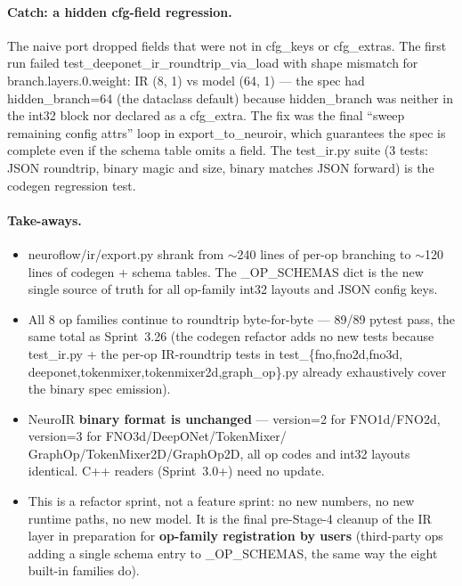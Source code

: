 \documentclass[10pt,twocolumn]{article}
\renewcommand{\texttt}[1]{{\normalfont\ttfamily #1}\normalfont\rmfamily}
\begin{document}
\paragraph{Catch: a hidden cfg-field regression.}
The naive port dropped fields that were not
in \texttt{cfg\_keys} or \texttt{cfg\_extras}.
The first run failed
\texttt{test\_deeponet\_ir\_roundtrip\_via\_load}
with \texttt{shape mismatch for
branch.layers.0.weight: IR (8, 1) vs model
(64, 1)} — the spec had
\texttt{hidden\_branch=64} (the dataclass
default) because \texttt{hidden\_branch} was
neither in the int32 block nor declared as a
\texttt{cfg\_extra}.  The fix was the final
``sweep remaining config attrs'' loop in
\texttt{export\_to\_neuroir}, which guarantees
the spec is complete even if the schema table
omits a field.  The \texttt{test\_ir.py}
suite (3 tests: JSON roundtrip, binary magic
and size, binary matches JSON forward) is the
codegen regression test.

\paragraph{Take-aways.}
\begin{itemize}
\item \texttt{neuroflow/ir/export.py} shrank
from $\sim$240 lines of per-op branching to
$\sim$120 lines of codegen + schema tables.
The \texttt{\_OP\_SCHEMAS} dict is the new
single source of truth for all op-family
int32 layouts and JSON config keys.
\item All 8 op families continue to roundtrip
byte-for-byte — 89/89 pytest pass, the same
total as Sprint~3.26 (the codegen refactor
adds no new tests because
\texttt{test\_ir.py} + the per-op IR-roundtrip
tests in \texttt{test\_\{fno,fno2d,fno3d,
deeponet,tokenmixer,tokenmixer2d,graph\_op\}.py}
already exhaustively cover the binary spec
emission).
\item NeuroIR \textbf{binary format is
unchanged} — version=2 for FNO1d/FNO2d,
version=3 for FNO3d/DeepONet/TokenMixer/
GraphOp/TokenMixer2D/GraphOp2D, all op codes
and int32 layouts identical.  C++ readers
(Sprint~3.0+) need no update.
\item This is a refactor sprint, not a
feature sprint: no new numbers, no new
runtime paths, no new model.  It is the
final pre-Stage-4 cleanup of the IR layer
in preparation for \textbf{op-family
registration by users} (third-party ops
adding a single schema entry to
\texttt{\_OP\_SCHEMAS}, the same way the
eight built-in families do).
\end{itemize}
\end{document}
